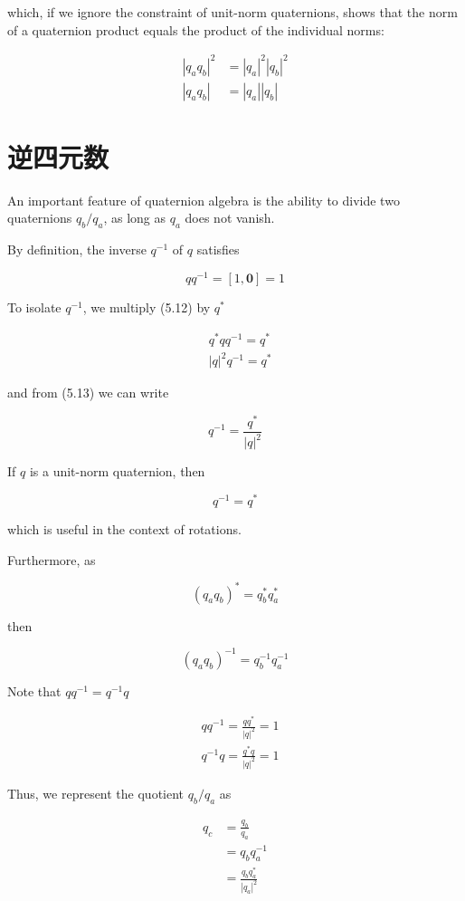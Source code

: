 which, if we ignore the constraint of unit-norm quaternions, shows that the norm of a quaternion product equals the product of the individual norms:

$$
\begin{aligned}
\left|q_{a} q_{b}\right|^{2} & =\left|q_{a}\right|^{2}\left|q_{b}\right|^{2} \\
\left|q_{a} q_{b}\right| & =\left|q_{a}\right|\left|q_{b}\right|
\end{aligned}
$$

\section{逆四元数}
An important feature of quaternion algebra is the ability to divide two quaternions $q_{b} / q_{a}$, as long as $q_{a}$ does not vanish.

By definition, the inverse $q^{-1}$ of $q$ satisfies

$$
q q^{-1}=[1, \mathbf{0}]=1
$$

To isolate $q^{-1}$, we multiply (5.12) by $q^{*}$

$$
\begin{aligned}
& q^{*} q q^{-1}=q^{*} \\
& |q|^{2} q^{-1}=q^{*}
\end{aligned}
$$

and from (5.13) we can write

$$
q^{-1}=\frac{q^{*}}{|q|^{2}}
$$

If $q$ is a unit-norm quaternion, then

$$
q^{-1}=q^{*}
$$

which is useful in the context of rotations.

Furthermore, as

$$
\left(q_{a} q_{b}\right)^{*}=q_{b}^{*} q_{a}^{*}
$$

then

$$
\left(q_{a} q_{b}\right)^{-1}=q_{b}^{-1} q_{a}^{-1}
$$

Note that $q q^{-1}=q^{-1} q$

$$
\begin{aligned}
& q q^{-1}=\frac{q q^{*}}{|q|^{2}}=1 \\
& q^{-1} q=\frac{q^{*} q}{|q|^{2}}=1
\end{aligned}
$$

Thus, we represent the quotient $q_{b} / q_{a}$ as

$$
\begin{aligned}
q_{c} & =\frac{q_{b}}{q_{a}} \\
& =q_{b} q_{a}^{-1} \\
& =\frac{q_{b} q_{a}^{*}}{\left|q_{a}\right|^{2}}
\end{aligned}
$$

